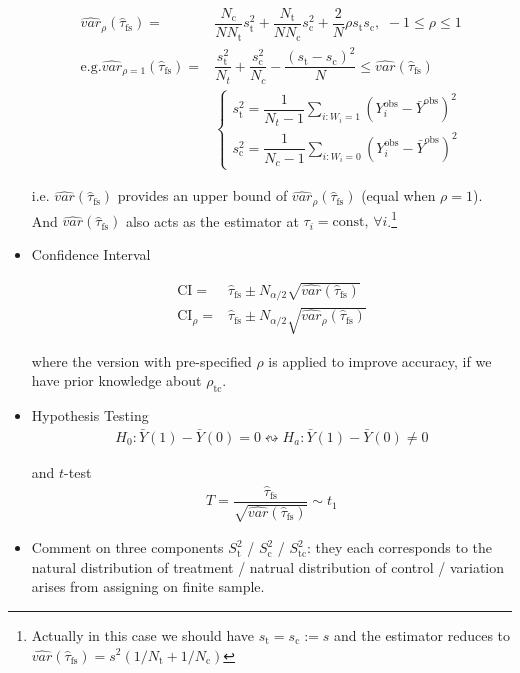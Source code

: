 \begin{itemize}[topsep=2pt,itemsep=0pt]
\begin{align}
        \hat{var}_\rho (\hat{\tau}_\mathrm{fs} )=&\dfrac{N_\mathrm{c} }{NN_\mathrm{t} }s_\mathrm{t} ^2+\dfrac{N_\mathrm{t} }{NN_\mathrm{c} }s_\mathrm{c}^2+\dfrac{2}{N}\rho s_\mathrm{t}s_\mathrm{c},\,\, -1\leq \rho \leq 1 \\
        \mathrm{e.g.}\hat{var}_{\rho =1}(\hat{\tau}_\mathrm{fs} )=& \dfrac{s^2_\mathrm{t} }{N_t}+\dfrac{s^2_\mathrm{c} }{N_c}-\dfrac{(s_\mathrm{t}-s_\mathrm{c}  )^2}{N}\leq \hat{var}(\hat{\tau}_\mathrm{fs} )\\ 
        &\begin{cases}
            s^2_\mathrm{t}=\dfrac{1}{N_t-1}\sum_{i:W_i=1}\left(Y_i^\mathrm{obs} -\bar{Y}^\mathrm{obs} \right)^2 \\
            s^2_\mathrm{c}=\dfrac{1}{N_c-1}\sum_{i:W_i=0}\left(Y_i^\mathrm{obs} -\bar{Y}^\mathrm{obs} \right)^2
        \end{cases}
    \end{align}

    i.e. $ \hat{var}(\hat{\tau}_\mathrm{fs} ) $ provides an upper bound of $ \hat{var}_\rho (\hat{\tau}_\mathrm{fs} ) $ (equal when $ \rho =1 $). And $  \hat{var}(\hat{\tau}_\mathrm{fs} )  $ also acts as the estimator at $ \tau_i=\mathrm{const},\,\forall i $.\footnote{Actually in this case we should have $ s_\mathrm{t}=s_\mathrm{c}:=s    $ and the estimator reduces to $ \hat{var}(\hat{\tau}_\mathrm{fs} )=s^2(1/N_\mathrm{t}+1/N_\mathrm{c}  ) $}

    
    
    \item Confidence Interval
    
    \begin{align}
        \mathrm{CI}=&  \hat{\tau}_\mathrm{fs}\pm N_{\alpha /2}\sqrt{\hat{var}(\hat{\tau}_\mathrm{fs} )}  \\
        \mathrm{CI}_\rho =&  \hat{\tau}_\mathrm{fs}\pm N_{\alpha /2}\sqrt{\hat{var}_\rho (\hat{\tau}_\mathrm{fs} )}  
    \end{align}
    
    where the version with pre-specified $ \rho  $ is applied to improve accuracy, if we have prior knowledge about $ \rho_\mathrm{tc}   $. 
    
    \item Hypothesis Testing
    \begin{align}
        H_0:\bar{Y}(1)-\bar{Y}(0)=0\leftrightsquigarrow H_a: \bar{Y}(1)-\bar{Y}(0)\neq 0
    \end{align}

    and $ t $-test
    \begin{align}
        T=\dfrac{\hat{\tau}_\mathrm{fs}    }{\sqrt{\hat{var}(\hat{\tau}_\mathrm{fs} )}} \sim t_1
    \end{align}
    \item Comment on three components $ S^2_\mathrm{t}$ / $S^2_{\mathrm{c} }$ / $S^2_{\mathrm{tc} }  $: they each corresponds to the natural distribution of treatment / natrual distribution of control / variation arises from assigning on finite sample.
    

\end{itemize}
